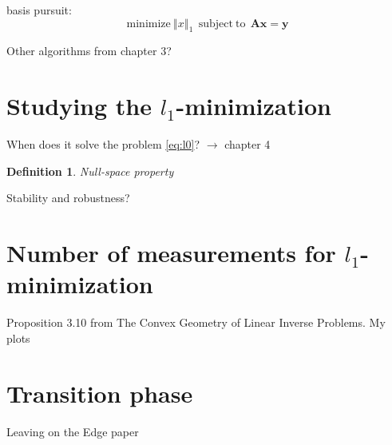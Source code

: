 \documentclass[11pt]{article}
\newtheorem{definition}{Definition}[section]
\newcommand{\norm}[1]{\left\Vert#1\right\Vert}
\begin{document}
basis pursuit:
\begin{equation}
    \mathrm{minimize} \ \norm{x}_1 \ \ \mathrm{subject\ to} \ \ \mathbf{Ax=y}
\end{equation}

Other algorithms from chapter 3?

\section{Studying the $l_1$-minimization}

When does it solve the problem \ref{eq:l0}? $\xrightarrow{}$ chapter 4

\begin{definition}
    Null-space property
\end{definition}

Stability and robustness?

\section{Number of measurements for $l_1$-minimization}

Proposition 3.10 from The Convex Geometry of Linear Inverse Problems.
My plots

\section{Transition phase}

Leaving on the Edge paper

\newpage
\end{document}
